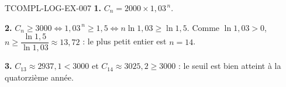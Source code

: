 \begin{corrige}{TCOMPL-LOG-EX-007}
\textbf{1.} $C_n=2000\times1{,}03^{\,n}$.

\textbf{2.} $C_n\geq3000\iff1{,}03^{\,n}\geq1{,}5
\iff n\ln1{,}03\geq\ln1{,}5$. Comme $\ln1{,}03>0$,
$n\geq\dfrac{\ln1{,}5}{\ln1{,}03}\approx13{,}72$ : le plus petit entier est
$n=14$.

\textbf{3.} $C_{13}\approx2937{,}1<3000$ et $C_{14}\approx3025{,}2\geq3000$ :
le seuil est bien atteint à la quatorzième année.
\end{corrige}
